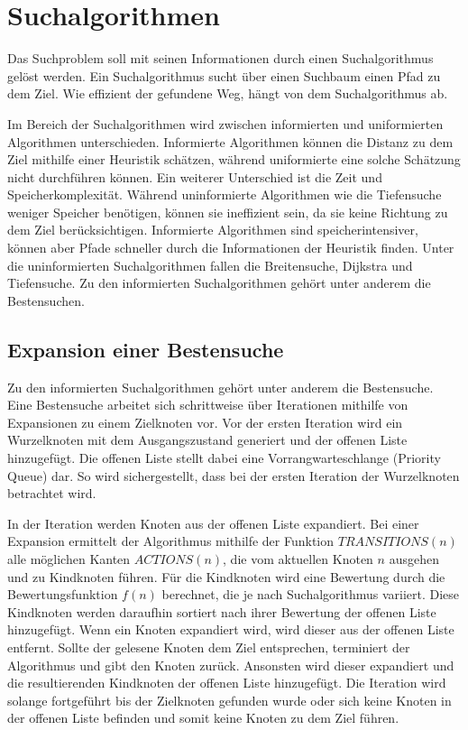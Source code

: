 \section{Suchalgorithmen}
\label{chap:suchalgorithmen}

Das Suchproblem soll mit seinen Informationen durch einen Suchalgorithmus gelöst werden. Ein Suchalgorithmus sucht über einen Suchbaum einen Pfad zu dem Ziel. Wie effizient der gefundene Weg, hängt von dem Suchalgorithmus ab. 

Im Bereich der Suchalgorithmen wird zwischen informierten und uniformierten Algorithmen unterschieden. Informierte Algorithmen können die Distanz zu dem Ziel mithilfe einer Heuristik schätzen, während uniformierte eine solche Schätzung nicht durchführen können. Ein weiterer Unterschied ist die Zeit und Speicherkomplexität. Während uninformierte Algorithmen wie die Tiefensuche weniger Speicher benötigen, können sie ineffizient sein, da sie keine Richtung zu dem Ziel berücksichtigen. Informierte Algorithmen sind speicherintensiver, können aber Pfade schneller durch die Informationen der Heuristik finden. Unter die uninformierten Suchalgorithmen fallen die Breitensuche, Dijkstra und Tiefensuche. Zu den informierten Suchalgorithmen gehört unter anderem die Bestensuchen.


\subsection{Expansion einer Bestensuche}
\label{chap:bestensuche}

Zu den informierten Suchalgorithmen gehört unter anderem die Bestensuche. Eine Bestensuche arbeitet sich schrittweise über Iterationen mithilfe von Expansionen zu einem Zielknoten vor. Vor der ersten Iteration wird ein Wurzelknoten mit dem Ausgangszustand generiert und der offenen Liste hinzugefügt. Die offenen Liste stellt dabei eine Vorrangwarteschlange (Priority Queue) dar. So wird sichergestellt, dass bei der ersten Iteration der Wurzelknoten betrachtet wird.

In der Iteration werden Knoten aus der offenen Liste expandiert. Bei einer Expansion ermittelt der Algorithmus mithilfe der Funktion $TRANSITIONS(n)$ alle möglichen Kanten $ACTIONS(n)$, die vom aktuellen Knoten $n$ ausgehen und zu Kindknoten führen. Für die Kindknoten wird eine Bewertung durch die Bewertungsfunktion $f(n)$ berechnet, die je nach Suchalgorithmus variiert. Diese Kindknoten werden daraufhin sortiert nach ihrer Bewertung der offenen Liste hinzugefügt. Wenn ein Knoten expandiert wird, wird dieser aus der offenen Liste entfernt. Sollte der gelesene Knoten dem Ziel entsprechen, terminiert der Algorithmus und gibt den Knoten zurück. Ansonsten wird dieser expandiert und die resultierenden Kindknoten der offenen Liste hinzugefügt. Die Iteration wird solange fortgeführt bis der Zielknoten gefunden wurde oder sich keine Knoten in der offenen Liste befinden und somit keine Knoten zu dem Ziel führen.


